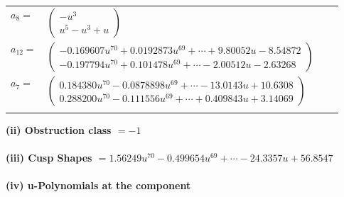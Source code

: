 \documentclass[1p]{elsarticle_modified}
\theoremstyle{definition}
\begin{document}
\begin{tabular}{m{7pt} m{180pt} m{7pt} m{180pt} }
\flushright $a_{8}=$&$\begin{pmatrix}- u^3\\u^5- u^3+u\end{pmatrix}$ \\
\flushright $a_{12}=$&$\begin{pmatrix}-0.169607 u^{70}+0.0192873 u^{69}+\cdots+9.80052 u-8.54872\\-0.197794 u^{70}+0.101478 u^{69}+\cdots-2.00512 u-2.63268\end{pmatrix}$ \\
\flushright $a_{7}=$&$\begin{pmatrix}0.184380 u^{70}-0.0878898 u^{69}+\cdots-13.0143 u+10.6308\\0.288200 u^{70}-0.111556 u^{69}+\cdots+0.409843 u+3.14069\end{pmatrix}$\\&\end{tabular}
\flushleft \textbf{(ii) Obstruction class $= -1$}\\~\\
\flushleft \textbf{(iii) Cusp Shapes $= 1.56249 u^{70}-0.499654 u^{69}+\cdots-24.3357 u+56.8547$}\\~\\
\newpage\renewcommand{\arraystretch}{1}
\flushleft \textbf{(iv) u-Polynomials at the component}\newline \\
\end{document}
